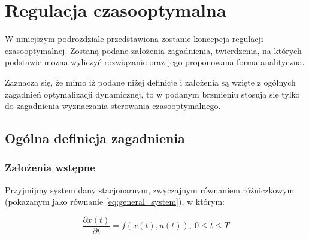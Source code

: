 \section{Regulacja czasooptymalna}
\label{sec:toc}

W niniejszym podrozdziale przedstawiona zostanie koncepcja regulacji czasooptymalnej. Zostaną podane założenia zagadnienia, twierdzenia, na których podstawie można wyliczyć rozwiązanie oraz jego proponowana forma analityczna.

Zaznacza się, że mimo iż podane niżej definicje i założenia są wzięte z ogólnych zagadnień optymalizacji dynamicznej, to w podanym brzmieniu stosują się tylko do zagadnienia wyznaczania sterowania czasooptymalnego.

\subsection{Ogólna definicja zagadnienia}
\label{sub:toc-def}

\subsubsection{Założenia wstępne}
\label{sub:toc-def-intro}
Przyjmijmy system dany stacjonarnym, zwyczajnym równaniem różniczkowym (pokazanym jako równanie \ref{eq:general_system}), w którym:

\begin{equation}\label{eq:general_system}
    \frac{\partial x(t)}{\partial t} = f(x(t), u(t)), ~ 0 \leq t \leq T
\end{equation}


